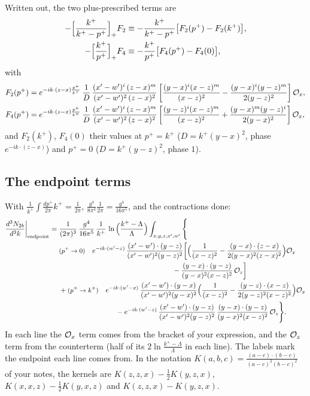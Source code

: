 \documentclass[10pt]{article}
\begin{document}
Written out, the two plus-prescribed terms are
\begin{align}
-\Big[\frac{k^{+}}{k^{+}-p^{+}}\Big]_{+}F_2&\equiv-\frac{k^+}{k^+-p^+}\big[F_2(p^+)-F_2(k^+)\big],\notag\\
-\Big[\frac{k^{+}}{p^{+}}\Big]_{+}F_4&\equiv-\frac{k^+}{p^+}\big[F_4(p^+)-F_4(0)\big],
\end{align}
with
\begin{align}
F_2(p^+)&=e^{-ik\cdot(z-x)\frac{p^{+}}{k^{+}}}\,\frac{1}{D}\,\frac{(x'-w')^{i}\,(z-x)^{m}}{(x'-w')^{2}\,(z-x)^{2}}\left[\frac{(y-x)^{i}(x-z)^{m}}{(x-z)^{2}}-\frac{(y-x)^{i}(y-z)^{m}}{2(y-z)^{2}}\right]{\cal O}_x,\notag\\
F_4(p^+)&=e^{-ik\cdot(z-x)\frac{p^{+}}{k^{+}}}\,\frac{1}{D}\,\frac{(x'-w')^{i}\,(z-x)^{m}}{(x'-w')^{2}\,(z-x)^{2}}\left[\frac{(y-z)^{i}(x-z)^{m}}{(x-z)^{2}}+\frac{(y-x)^{m}(y-z)^{i}}{2(y-x)^{2}}\right]{\cal O}_x,
\end{align}
and $F_2(k^+)$, $F_4(0)$ their values at $p^+=k^+$ ($D=k^+(y-x)^2$, phase $e^{-ik\cdot(z-x)}$) and $p^+=0$ ($D=k^+(y-z)^2$, phase $1$).

\subsection{The endpoint terms}
With $\frac{1}{k^+}\int\frac{dp^+}{2\pi}k^+=\frac{1}{2\pi}$, $\frac{g^4}{8\pi^4}\frac{1}{2\pi}=\frac{g^4}{16\pi^5}$, and the contractions done:
\begin{align}
\frac{d^{3}N_{2b}}{d^{3}k}\bigg|_{\rm endpoint}={}&\frac{1}{(2\pi)^{3}}\,\frac{g^{4}}{16\pi^{5}}\,\frac{1}{k^{+}}\,\ln\Big(\frac{k^+-\Lambda}{\Lambda}\Big)\int_{x,y,z,x',w'}\Bigg\{\notag\\
&\text{\small($p^+\to0$)}\quad e^{-ik\cdot(w'-z)}\,\frac{(x'-w')\cdot(y-z)}{(x'-w')^{2}(y-z)^{2}}\bigg[\Big(\frac{1}{(x-z)^{2}}-\frac{(y-x)\cdot(z-x)}{2(y-x)^{2}(z-x)^{2}}\Big){\cal O}_x\notag\\
&\hspace{16em}-\frac{(y-x)\cdot(y-z)}{(y-x)^{2}(x-z)^{2}}\,{\cal O}_z\bigg]\notag\\
&+\text{\small($p^+\to k^+$)}\quad e^{-ik\cdot(w'-x)}\,\frac{(x'-w')\cdot(y-x)}{(x'-w')^{2}(y-x)^{2}}\Big(\frac{1}{(x-z)^{2}}-\frac{(y-z)\cdot(x-z)}{2(y-z)^{2}(x-z)^{2}}\Big){\cal O}_x\notag\\
&\hspace{8em}-e^{-ik\cdot(w'-z)}\,\frac{(x'-w')\cdot(y-z)}{(x'-w')^{2}(y-z)^{2}}\,\frac{(y-x)\cdot(y-z)}{(y-x)^{2}(x-z)^{2}}\,{\cal O}_z\Bigg\}.
\label{eq:end}
\end{align}
In each line the ${\cal O}_x$ term comes from the bracket of your expression, and the ${\cal O}_z$ term from the counterterm (half of its $2\ln\frac{k^+-\Lambda}{\Lambda}$ in each line). The labels mark the endpoint each line comes from. In the notation $K(a,b,c)=\frac{(a-c)\cdot(b-c)}{(a-c)^2(b-c)^2}$ of your notes, the kernels are $K(z,z,x)-\tfrac12K(y,z,x)$, $K(x,x,z)-\tfrac12K(y,x,z)$ and $K(z,z,x)-K(y,z,x)$.
\end{document}
